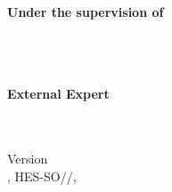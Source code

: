 \begin{titlepage}
\begin{center}
        \begin{minipage}{0.48\textwidth}
            \centering
            {\large\textbf{Under the supervision of}}\\
            {\large\Advisor}\\
            {\large\SAdvisor}\\
            {\small\AdvisorResearchUnit}\\
        \end{minipage}
        \hfill%
        \begin{minipage}{0.48\textwidth}
            \centering
            {\large\textbf{External Expert}}\\
            {\large\Expert}\\
        \end{minipage}
        \\[1.5cm]

        \vfill%
        {\small Version \version} \\
        {\small\Place, HES-SO//\Diploma, \Date}

    \end{center}
    \restoregeometry%
\end{titlepage}
